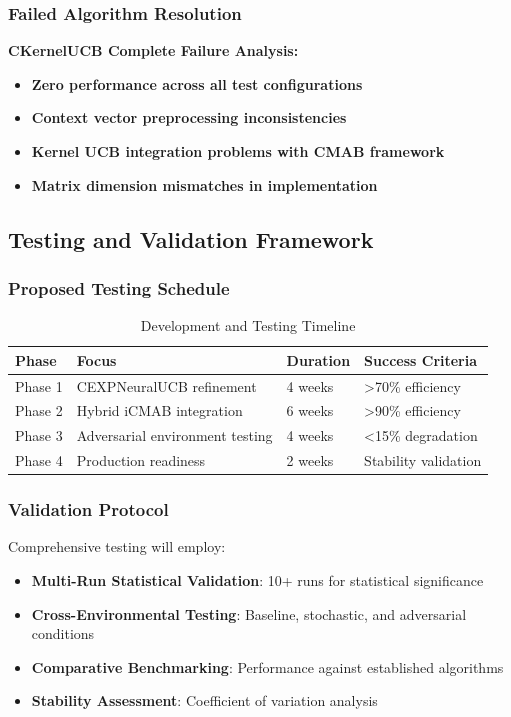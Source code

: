 \documentclass[12pt,a4paper]{article}
\newcommand{\critical}[1]{\textcolor{criticalcolor}{\textbf{#1}}}
\begin{document}
\subsubsection{Failed Algorithm Resolution}

\textbf{CKernelUCB Complete Failure Analysis:}
\begin{itemize}
\item \critical{Zero performance across all test configurations}
\item \critical{Context vector preprocessing inconsistencies}
\item \critical{Kernel UCB integration problems with CMAB framework}
\item \critical{Matrix dimension mismatches in implementation}
\end{itemize}

\subsection{Testing and Validation Framework}

\subsubsection{Proposed Testing Schedule}

\begin{table}[H]
\centering
\caption{Development and Testing Timeline}
\begin{tabular}{|l|l|l|l|}
\hline
\textbf{Phase} & \textbf{Focus} & \textbf{Duration} & \textbf{Success Criteria} \\
\hline
\hline
Phase 1 & CEXPNeuralUCB refinement & 4 weeks & >70\% efficiency \\
Phase 2 & Hybrid iCMAB integration & 6 weeks & >90\% efficiency \\
Phase 3 & Adversarial environment testing & 4 weeks & <15\% degradation \\
Phase 4 & Production readiness & 2 weeks & Stability validation \\
\hline
\end{tabular}
\end{table}

\subsubsection{Validation Protocol}

Comprehensive testing will employ:
\begin{itemize}
\item \textbf{Multi-Run Statistical Validation}: 10+ runs for statistical significance
\item \textbf{Cross-Environmental Testing}: Baseline, stochastic, and adversarial conditions
\item \textbf{Comparative Benchmarking}: Performance against established algorithms
\item \textbf{Stability Assessment}: Coefficient of variation analysis
\end{itemize}
\end{document}
